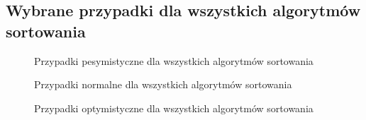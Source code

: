 \documentclass[12pt, polish]{article}
\begin{document}
\newpage	
\subsection{Wybrane przypadki dla wszystkich algorytmów sortowania}	
	
\begin{figure}[ht]
	\centering
	\quad
	\caption{Przypadki pesymistyczne dla wszystkich algorytmów sortowania}
\end{figure}

\newpage
\begin{figure}[ht]
	\centering
	\quad
	\caption{Przypadki normalne dla wszystkich algorytmów sortowania}
\end{figure}

\begin{figure}[ht]
	\centering
	\quad
	\caption{Przypadki optymistyczne dla wszystkich algorytmów sortowania}
\end{figure}
\end{document}
